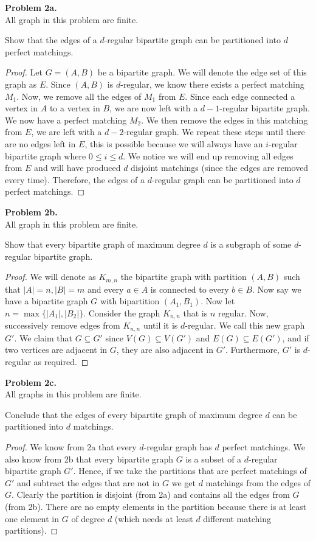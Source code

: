 \documentclass{article}
\newcommand{\size}[1]{|#1|}
\newcommand{\set}[1]{\{#1\}}
\newenvironment{hwproof}[2]
{
    \textbf{Problem #1.}\\
    #2
    \begin{proof}
}{
    \end{proof}
}
\begin{document}
\begin{hwproof}
    {2a}
    {All graph in this problem are finite.

        Show that the edges of a $d$-regular bipartite graph can be partitioned into $d$ perfect matchings.}

    Let $G = (A,B)$ be a bipartite graph. We will denote the edge set
    of this graph as $E$. Since $(A,B)$ is $d$-regular, we know there exists a perfect matching $M_1$. Now, we remove
    all the edges of $M_1$ from $E$. Since each edge connected a vertex in $A$ to a vertex in $B$, we are now left
    with a $d-1$-regular bipartite graph. We now have a perfect matching $M_2$. We then remove the edges in this matching
    from $E$, we are left with a $d-2$-regular graph. We repeat these steps until there are no edges left in $E$, this
    is possible because we will always have an $i$-regular bipartite graph where $0\leq i \leq d$. We notice
    we will end up removing all edges from $E$ and will have produced $d$ disjoint matchings (since the edges are
    removed every time). Therefore, the edges of a $d$-regular graph can be partitioned into $d$ perfect matchings.
\end{hwproof}

\begin{hwproof}
    {2b}
    {All graph in this problem are finite.

        Show that every bipartite graph of maximum degree $d$ is a subgraph of some $d$-regular bipartite graph.
    }
    We will denote as $K_{m,n}$ the bipartite graph with partition $(A,B)$ such that $\size{A} = n, \size{B} = m$ and
    every $a \in A$ is connected to every $b \in B$. Now say we have a bipartite graph $G$ with bipartition $(A_1, B_1)$.
    Now let $n = \max\set{\size{A_1}, \size{B_2}}$. Consider the graph $K_{n,n}$ that is $n$ regular. Now, successively remove edges from $K_{n,n}$
    until it is $d$-regular. We call this new graph $G'$. We claim that $G \subseteq G'$ since $V(G) \subseteq V(G')$ and $E(G) \subseteq E(G')$, and
    if two vertices are adjacent in $G$, they are also adjacent in $G'$. Furthermore, $G'$ is $d$-regular as required.
\end{hwproof}

\begin{hwproof}
    {2c}
    {All graphs in this problem are finite.

        Conclude that the edges of every bipartite graph of maximum degree $d$ can be partitioned into $d$ matchings.
    }
    We know from 2a that every $d$-regular graph has $d$ perfect matchings. We also know from 2b that every
    bipartite graph $G$ is a subset of a $d$-regular bipartite graph $G'$. Hence, if we take the partitions that
    are perfect matchings of $G'$ and subtract the edges that are not in $G$ we get $d$ matchings from the edges
    of $G$. Clearly the partition is disjoint (from 2a) and contains all the edges from $G$ (from 2b). There are no empty elements in the partition
    because there is at least one element in $G$ of degree $d$ (which needs at least $d$ different matching partitions).
\end{hwproof}
\end{document}
